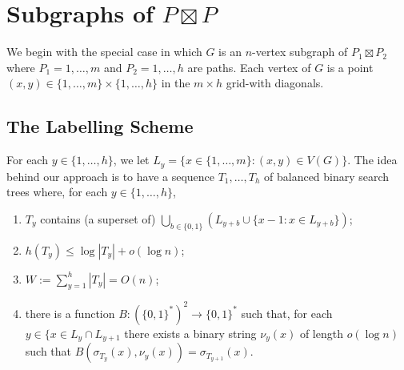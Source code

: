 \documentclass[kpfonts]{patmorin}
\newcommand{\pnote}[1]{\ \newline\noindent\fcolorbox{red}{yellow}{\begin{minipage}{\textwidth}#1\end{minipage}}}
\begin{document}
% 
% 
% 
% 
% 


\section{Subgraphs of $P\boxtimes P$}

We begin with the special case in which $G$ is an $n$-vertex subgraph of $P_1\boxtimes P_2$ where $P_1=1,\ldots,m$ and $P_2=1,\ldots,h$ are paths. Each vertex of $G$ is a point $(x,y)\in\{1,\ldots,m\}\times \{1,\ldots,h\}$ in the $m\times h$ grid-with diagonals.  


\subsection{The Labelling Scheme}

For each $y\in\{1,\ldots,h\}$, we let $L_y=\{x\in\{1,\ldots,m\}:(x,y)\in V(G)\}$.  The idea behind our approach is to have a sequence $T_1,\ldots,T_h$ of balanced binary search trees where, for each $y\in\{1,\ldots,h\}$,
\begin{enumerate}[(PR1)]
  \item $T_y$ contains (a superset of) $\bigcup_{b\in\{0,1\}} (L_{y+b}\cup \{x-1:x\in L_{y+b}\})$;
  
  \item $h(T_y)\le\log |T_y| + o(\log n)$;
  
  \item $W:=\sum_{y=1}^h |T_y| = O(n)$;
  
  \item there is a function $B:(\{0,1\}^*)^2\to\{0,1\}^*$ such that, for each $y\in\{x\in L_y\cap L_{y+1}$ there exists a binary string $\nu_y(x)$ of length $o(\log n)$ such that $B(\sigma_{T_{y}}(x), \nu_y(x))=\sigma_{T_{y+1}}(x)$.
\end{enumerate}
\end{document}
